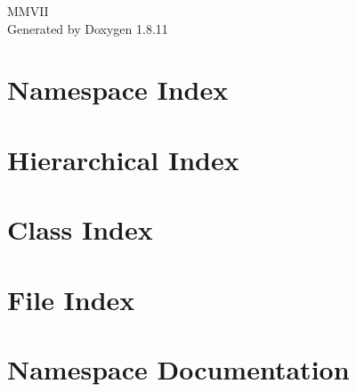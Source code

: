 \documentclass[twoside]{book}
\newcommand{\+}{\discretionary{\mbox{\scriptsize$\hookleftarrow$}}{}{}}
\newcommand{\clearemptydoublepage}{%
  \newpage{\pagestyle{empty}\cleardoublepage}%
}
\begin{document}
\hypersetup{pageanchor=false,
             bookmarksnumbered=true,
             pdfencoding=unicode
            }
\begin{titlepage}
\vspace*{7cm}
\begin{center}%
{\Large M\+M\+V\+II }\\
\vspace*{1cm}
{\large Generated by Doxygen 1.8.11}\\
\end{center}
\end{titlepage}
\clearemptydoublepage
\tableofcontents
\clearemptydoublepage
{}
\hypersetup{pageanchor=true}

\chapter{Namespace Index}

\chapter{Hierarchical Index}

\chapter{Class Index}

\chapter{File Index}

\chapter{Namespace Documentation}

\end{document}
